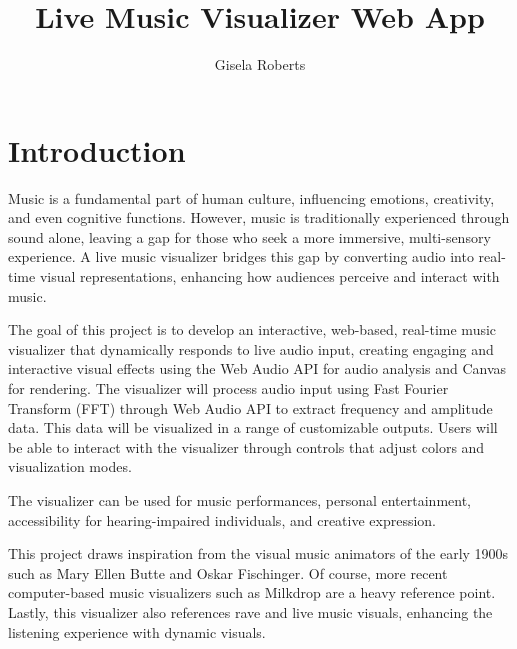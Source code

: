 \documentclass[10pt,twocolumn]{article}
\title{Live Music Visualizer Web App}
\author{Gisela Roberts}
\affiliation{Occidental College}
\begin{document}
\maketitle

\section{Introduction}
Music is a fundamental part of human culture, influencing emotions, creativity, and even cognitive functions. However, music is traditionally experienced through sound alone, leaving a gap for those who seek a more immersive, multi-sensory experience. A live music visualizer bridges this gap by converting audio into real-time visual representations, enhancing how audiences perceive and interact with music.

The goal of this project is to develop an interactive, web-based, real-time music visualizer that dynamically responds to live audio input, creating engaging and interactive visual effects using the Web Audio API for audio analysis and Canvas for rendering. 
The visualizer will process audio input using Fast Fourier Transform (FFT) through Web Audio API to extract frequency and amplitude data. This data will be visualized in a range of customizable outputs.
Users will be able to interact with the visualizer through controls that adjust colors and visualization modes. 

The visualizer can be used for music performances, personal entertainment, accessibility for hearing-impaired individuals, and creative expression.

This project draws inspiration from the visual music animators of the early 1900s such as Mary Ellen Butte and Oskar Fischinger. Of course, more recent computer-based music visualizers such as Milkdrop are a heavy reference point. Lastly, this visualizer also references rave and live music visuals, enhancing the listening experience with dynamic visuals. 
\end{document}

